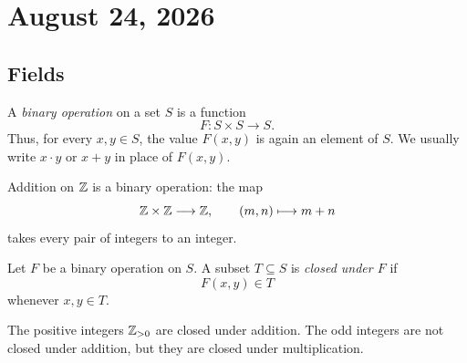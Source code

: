 \section{August 24, 2026}

\subsection{Fields}

\begin{definition}
  A \emph{binary operation} on a set $S$ is a function
  \[
    F\colon S\times S\longrightarrow S.
  \]
  Thus, for every $x,y\in S$, the value $F(x,y)$ is again an element of
  $S$. We usually write $x\cdot y$ or $x+y$ in place of $F(x,y)$.
\end{definition}

\begin{example}
  Addition on $\mathbb{Z}$ is a binary operation: the map
  \[
    \mathbb{Z}\times\mathbb{Z}\longrightarrow\mathbb{Z},
    \qquad (m,n)\longmapsto m+n
  \]
  takes every pair of integers to an integer.
\end{example}

\begin{definition}
  Let $F$ be a binary operation on $S$. A subset $T\subseteq S$ is
  \emph{closed under $F$} if
  \[
    F(x,y)\in T
  \]
  whenever $x,y\in T$.
\end{definition}

\begin{example}
  The positive integers $\mathbb{Z}_{>0}$ are closed under addition. The odd
  integers are not closed under addition, but they are closed under
  multiplication.
\end{example}

